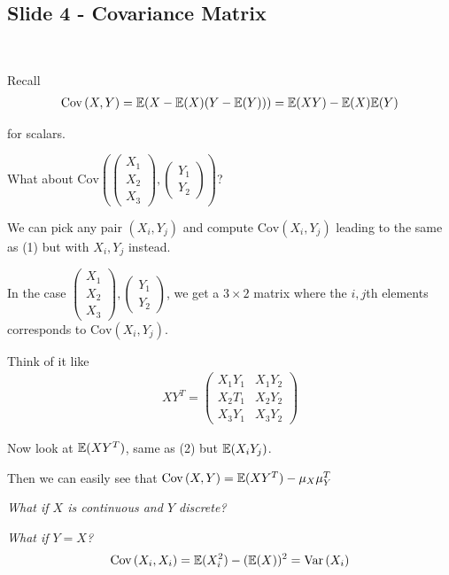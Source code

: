 \subsection{Slide 4 - Covariance Matrix}\hfill\\
\par\bigskip
\noindent Recall 
\begin{equation}
  \begin{gathered}
     \text{Cov}\left(X,Y\right) = \mathbb{E}(X-\mathbb{E}(X)(Y-\mathbb{E}(Y))) = \mathbb{E}(XY)-\mathbb{E}(X)\mathbb{E}(Y)
  \end{gathered}
\end{equation}
\par\bigskip
\noindent for scalars.\par
\noindent What about $\text{Cov}\left(\begin{pmatrix}X_1\\X_2\\X_3\end{pmatrix}, \begin{pmatrix}Y_1\\Y_2\end{pmatrix}\right)$?
\par\bigskip
\noindent We can pick any pair $(X_i,Y_j)$ and compute $\text{Cov}\left(X_i,Y_j\right)$ leading to the same as (1) but with $X_i, Y_j$ instead.
\par\bigskip
\noindent In the case $\begin{pmatrix}X_1\\X_2\\X_3\end{pmatrix}, \begin{pmatrix}Y_1\\Y_2\end{pmatrix}$, we get a $3\times 2$ matrix where the $i,j$th elements corresponds to $\text{Cov}\left(X_i,Y_j\right)$.
\par\bigskip
\noindent Think of it like
\begin{equation}
  \begin{gathered}
    XY^T = \begin{pmatrix}X_1Y_1 &X_1Y_2\\X_2T_1&X_2Y_2\\X_3Y_1&X_3Y_2\end{pmatrix}
  \end{gathered}
\end{equation}
\par\bigskip
\noindent Now look at $\mathbb{E}(XY^T)$, same as (2) but $\mathbb{E}(X_iY_j)$.\par
\noindent Then we can easily see that $\text{Cov}\left(X,Y\right) = \mathbb{E}(XY^T)-\mu_X\mu_Y^T$
\par\bigskip
\noindent\textit{What if $X$ is continuous and $Y$ discrete?}\par
\noindent\textit{What if $Y=X$?}
\begin{equation*}
  \begin{gathered}
    \text{Cov}\left(X_i,X_i\right) = \mathbb{E}(X_i^2)-(\mathbb{E}(X))^2 = \text{Var}\left(X_i\right)
  \end{gathered}
\end{equation*}
\par\bigskip
